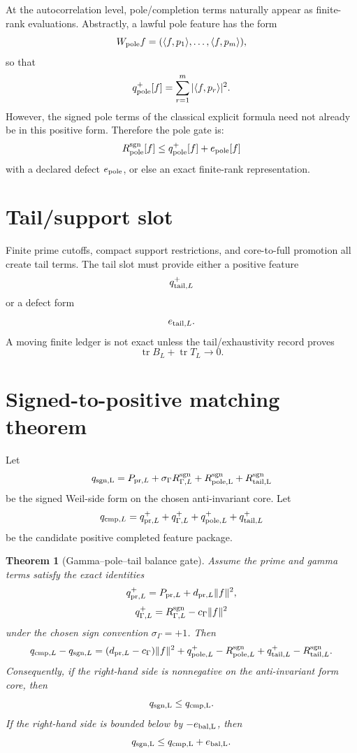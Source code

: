 \documentclass[11pt]{article}
\newtheorem{theorem}{Theorem}
\newcommand{\ip}[2]{\langle #1,#2\rangle}
\begin{document}
At the autocorrelation level, pole/completion terms naturally appear as finite-rank evaluations. Abstractly, a lawful pole feature has the form
\[
  W_{\rm pole}f=(\ip{f}{p_1},\ldots,\ip{f}{p_m}),
\]
so that
\[
  q^+_{\rm pole}[f]=\sum_{r=1}^m |\ip{f}{p_r}|^2.
\]
However, the signed pole terms of the classical explicit formula need not already be in this positive form. Therefore the pole gate is:
\[
  R^{\rm sgn}_{\rm pole}[f]\le q^+_{\rm pole}[f]+e_{\rm pole}[f]
\]
with a declared defect \(e_{\rm pole}\), or else an exact finite-rank representation.

\section{Tail/support slot}
Finite prime cutoffs, compact support restrictions, and core-to-full promotion all create tail terms.  The tail slot must provide either a positive feature
\[
  q^+_{{\rm tail},L}
\]
or a defect form
\[
  e_{{\rm tail},L}.
\]
A moving finite ledger is not exact unless the tail/exhaustivity record proves
\[
  \operatorname{tr}B_L+\operatorname{tr}T_L\to 0.
\]

\section{Signed-to-positive matching theorem}
Let
\[
  q_{\rm sgn,L}=P_{{\rm pr},L}+\sigma_\Gamma R_{\Gamma,L}^{\rm sgn}+R_{\rm pole,L}^{\rm sgn}+R_{\rm tail,L}^{\rm sgn}
\]
be the signed Weil-side form on the chosen anti-invariant core. Let
\[
  q_{{\rm cmp},L}=q^+_{{\rm pr},L}+q^+_{\Gamma,L}+q^+_{{\rm pole},L}+q^+_{{\rm tail},L}
\]
be the candidate positive completed feature package.

\begin{theorem}[Gamma--pole--tail balance gate]
Assume the prime and gamma terms satisfy the exact identities
\[
  q^+_{{\rm pr},L}=P_{{\rm pr},L}+d_{{\rm pr},L}\|f\|^2,
\]
\[
  q^+_{\Gamma,L}=R_{\Gamma,L}^{\rm sgn}-c_\Gamma\|f\|^2
\]
under the chosen sign convention \(\sigma_\Gamma=+1\). Then
\[
  q_{{\rm cmp},L}-q_{{\rm sgn},L}
  = (d_{{\rm pr},L}-c_\Gamma)\|f\|^2
  +q^+_{{\rm pole},L}-R^{\rm sgn}_{{\rm pole},L}
  +q^+_{{\rm tail},L}-R^{\rm sgn}_{{\rm tail},L}.
\]
Consequently, if the right-hand side is nonnegative on the anti-invariant form core, then
\[
  q_{\rm sgn,L}\le q_{\rm cmp,L}.
\]
If the right-hand side is bounded below by \(-e_{\rm bal,L}\), then
\[
  q_{\rm sgn,L}\le q_{\rm cmp,L}+e_{\rm bal,L}.
\]
\end{theorem}
\end{document}

